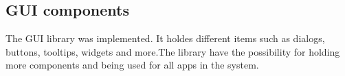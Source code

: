 \subsection{GUI components}
\label{backlog:GUI_components}

The \giraf[] GUI library was implemented. It holdes different items such as dialogs, buttons, tooltips, widgets and more.The library have the possibility for holding more components and being used for all apps in the system.
